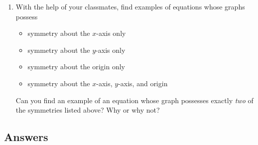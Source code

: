 \documentclass{ximera}
\begin{document}
\begin{enumerate}
\setcounter{enumi}{\value{HW}}

\item  With the help of your classmates, find examples of equations whose graphs possess 

\begin{itemize}

\item  symmetry about the $x$-axis only

\item  symmetry about the $y$-axis only

\item  symmetry about the origin only

\item  symmetry about the $x$-axis, $y$-axis, and origin

\end{itemize}

Can you find an example of an equation whose graph possesses exactly \textit{two} of the symmetries listed above?  Why or why not?

\end{enumerate}




\newpage

\subsection{Answers}
\end{document}
